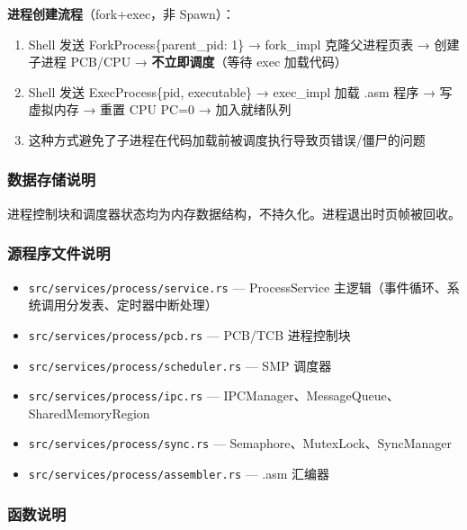 \documentclass[UTF8,a4paper,12pt]{ctexart}
\begin{document}
\textbf{进程创建流程}（fork+exec，非 Spawn）：

\begin{enumerate}[label=(\arabic*)]
    \item Shell 发送 ForkProcess\{parent\_pid: 1\} → fork\_impl 克隆父进程页表 → 创建子进程 PCB/CPU → \textbf{不立即调度}（等待 exec 加载代码）
    \item Shell 发送 ExecProcess\{pid, executable\} → exec\_impl 加载 .asm 程序 → 写虚拟内存 → 重置 CPU PC=0 → 加入就绪队列
    \item 这种方式避免了子进程在代码加载前被调度执行导致页错误/僵尸的问题
\end{enumerate}

\subsubsection{数据存储说明}

进程控制块和调度器状态均为内存数据结构，不持久化。进程退出时页帧被回收。

\subsubsection{源程序文件说明}

\begin{itemize}
    \item \texttt{src/services/process/service.rs} — ProcessService 主逻辑（事件循环、系统调用分发表、定时器中断处理）
    \item \texttt{src/services/process/pcb.rs} — PCB/TCB 进程控制块
    \item \texttt{src/services/process/scheduler.rs} — SMP 调度器
    \item \texttt{src/services/process/ipc.rs} — IPCManager、MessageQueue、SharedMemoryRegion
    \item \texttt{src/services/process/sync.rs} — Semaphore、MutexLock、SyncManager
    \item \texttt{src/services/process/assembler.rs} — .asm 汇编器
\end{itemize}

\subsubsection{函数说明}
\end{document}
